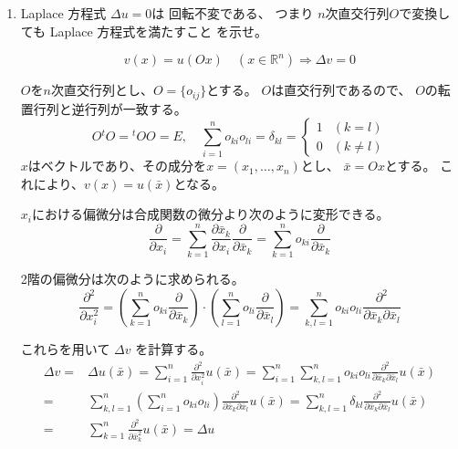 \documentclass[12pt,b5paper]{ltjsarticle}
\begin{document}
\begin{enumerate}
 \item

      Laplace 方程式 $\Delta u =0$は
      回転不変である、
      つまり
      $n$次直交行列$O$で変換しても
      Laplace 方程式を満たすこと
      を示せ。

      \begin{equation}
       v(x) = u(Ox) \quad (x\in\mathbb{R}^{n})
        \Rightarrow
        \Delta v = 0
      \end{equation}

      \dotfill

      $O$を$n$次直交行列とし、$O=\{o_{ij}\}$とする。
      $O$は直交行列であるので、
      $O$の転置行列と逆行列が一致する。
      \begin{equation}
       O{}^{t}O = {}^{t}O O = E
        ,\quad
        \sum_{i=1}^{n}o_{ki}o_{li} = \delta_{kl}
        =
        \begin{cases}
         1 & (k=l)\\
         0 & (k\ne l)
        \end{cases}
      \end{equation}
      $x$はベクトルであり、その成分を$x=(x_{1},\dots,x_{n})$とし、
      $\bar{x} = Ox$とする。
      これにより、$v(x)=u(\bar{x})$となる。

      $x_{i}$における偏微分は合成関数の微分より次のように変形できる。
      \begin{equation}
       \frac{\partial}{\partial x_{i}}
        = \sum_{k=1}^{n}\frac{\partial \bar{x}_{k}}{\partial x_{i}}
              \frac{\partial}{\partial \bar{x}_{k}}
        = \sum_{k=1}^{n} o_{ki}\frac{\partial}{\partial \bar{x}_{k}}
      \end{equation}

      2階の偏微分は次のように求められる。
      \begin{equation}
       \frac{\partial^{2}}{\partial x_{i}^{2}}
        =\left( \sum_{k=1}^{n} o_{ki}\frac{\partial}{\partial \bar{x}_{k}} \right) \cdot
        \left( \sum_{l=1}^{n} o_{li}\frac{\partial}{\partial \bar{x}_{l}} \right)
        =
        \sum_{k,l = 1}^{n} o_{ki}o_{li}\frac{\partial^{2}}{\partial \bar{x}_{k}\partial \bar{x}_{l}}
      \end{equation}

      これらを用いて
      $\Delta v$ を計算する。
      \begin{align}
       \Delta v
         =& \Delta u(\bar{x})
         = \sum_{i=1}^{n} \frac{\partial^2}{\partial x_{i}^{2}}u(\bar{x})
         = \sum_{i=1}^{n} \sum_{k,l = 1}^{n} o_{ki}o_{li}
           \frac{\partial^{2}}{\partial \bar{x}_{k}\partial \bar{x}_{l}} u(\bar{x})\\
         =& \sum_{k,l = 1}^{n} \left( \sum_{i=1}^{n} o_{ki}o_{li} \right)
           \frac{\partial^{2}}{\partial \bar{x}_{k}\partial \bar{x}_{l}} u(\bar{x})
         = \sum_{k,l = 1}^{n} \delta_{kl}
           \frac{\partial^{2}}{\partial \bar{x}_{k}\partial \bar{x}_{l}} u(\bar{x})\\
         =& \sum_{k = 1}^{n}
           \frac{\partial^{2}}{\partial \bar{x}_{k}^{2}} u(\bar{x})
         = \Delta u
      \end{align}


\end{enumerate}
\end{document}
